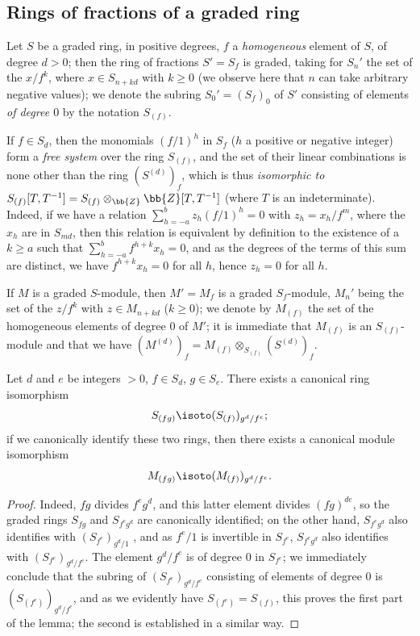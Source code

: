 \subsection{Rings of fractions of a graded ring}
\label{subsection:II.2.2}

\begin{env}[2.2.1]
\label{II.2.2.1}
Let $S$ be a graded ring, in positive degrees, $f$ a \emph{homogeneous} element of $S$, of degree $d>0$;
then the ring of fractions $S'=S_f$ is graded, taking for $S_n'$ the set of the $x/f^k$, where $x\in S_{n+kd}$ with $k\geq 0$ (we observe here that $n$ can take arbitrary negative values);
we denote the subring $S_0'=(S_f)_0$ of $S'$ consisting of elements \emph{of degree $0$} by the notation $S_{(f)}$.

If $f\in S_d$, then the monomials $(f/1)^h$ in $S_f$ ($h$ a positive or negative integer) form a \emph{free system} over the ring $S_{(f)}$, and the set of their linear combinations is none other than
the ring $(S^{(d)})_f$, which is thus \emph{isomorphic to $S_{(f)}[T,T^{-1}]=S_{(f)}\otimes_\bb{Z}\bb{Z}[T,T^{-1}]$} (where $T$ is an indeterminate).
Indeed, if we have a relation $\sum_{h=-a}^b z_h(f/1)^h=0$ with $z_h=x_h/f^m$, where the $x_h$ are in $S_{md}$, then this relation is equivalent by definition to the existence of a $k\geq a$ such that $\sum_{h=-a}^b f^{h+k}x_h=0$, and as the degrees of the terms of this sum are distinct, we have $f^{h+k}x_h=0$ for all $h$, hence $z_h=0$ for all $h$.

If $M$ is a graded $S$-module, then $M'=M_f$ is a graded $S_f$-module, $M_n'$ being the set of the $z/f^k$ with $z\in M_{n+kd}$ ($k\geq 0$);
we denote by $M_{(f)}$ the set of the homogeneous elements of degree $0$ of $M'$;
it is immediate that $M_{(f)}$ is an $S_{(f)}$-module and that we have $(M^{(d)})_f=M_{(f)}\otimes_{S_{(f)}}(S^{(d)})_f$.
\end{env}

\begin{lemma}[2.2.2]
\label{II.2.2.2}
Let $d$ and $e$ be integers $>0$, $f\in S_d$, $g\in S_e$.
There exists a canonical ring isomorphism
\[
  S_{(fg)}\isoto(S_{(f)})_{g^d/f^e};
\]
if we canonically identify these two rings, then there exists a canonical module isomorphism
\[
  M_{(fg)}\isoto(M_{(f)})_{g^d/f^e}.
\]
\end{lemma}

\begin{proof}
Indeed, $fg$ divides $f^e g^d$, and this latter element divides $(fg)^{de}$, so the graded rings $S_{fg}$ and $S_{f^e g^d}$ are canonically identified;
on the other hand, $S_{f^e g^d}$ also identifies with $(S_{f^e})_{g^d/1}$ , and as $f^e/1$ is invertible in $S_{f^e}$, $S_{f^e g^d}$ also identifies with $(S_{f^e})_{g^d/f^e}$.
The element $g^d/f^e$ is of degree $0$ in $S_{f^e}$;
we immediately conclude that the subring of $(S_{f^e})_{g^d/f^e}$ consisting of elements of degree $0$ is $(S_{(f^e)})_{g^d/f^e}$, and as we evidently have $S_{(f^e)}=S_{(f)}$, this proves the first part of the lemma;
the second is established in a similar way.
\end{proof}


